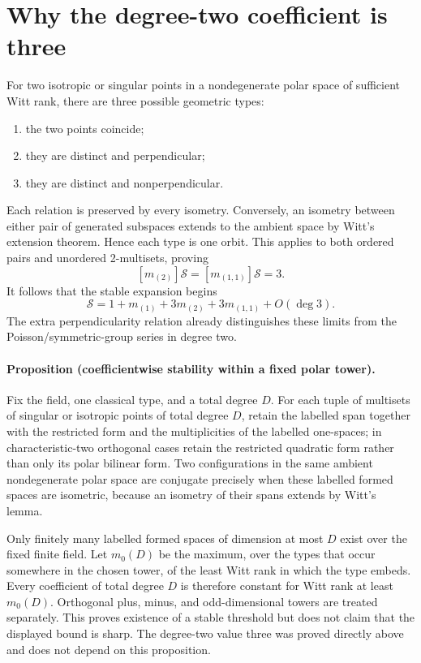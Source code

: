 \documentclass[10pt]{article}
\newcommand{\Sg}{\mathcal S}
\begin{document}
\section{Why the degree-two coefficient is three}
For two isotropic or singular points in a nondegenerate polar space of
sufficient Witt rank, there are three possible geometric types:
\begin{enumerate}
 \item the two points coincide;
 \item they are distinct and perpendicular;
 \item they are distinct and nonperpendicular.
\end{enumerate}
Each relation is preserved by every isometry.  Conversely, an isometry
between either pair of generated subspaces extends to the ambient space by
Witt's extension theorem.  Hence each type is one orbit.  This applies to
both ordered pairs and unordered 2-multisets, proving
\begin{equation}
 \boxed{[m_{(2)}]\Sg=[m_{(1,1)}]\Sg=3.}
\end{equation}
It follows that the stable expansion begins
\[
 \Sg=1+m_{(1)}+3m_{(2)}+3m_{(1,1)}+O(\deg3).
\]
The extra perpendicularity relation already distinguishes these limits from
the Poisson/symmetric-group series in degree two.

\paragraph{Proposition (coefficientwise stability within a fixed polar tower).}
Fix the field, one classical type, and a total degree $D$.  For each tuple of
multisets of singular or isotropic points of total degree $D$, retain the
labelled span together with the restricted form and the multiplicities of the
labelled one-spaces; in characteristic-two orthogonal cases retain the
restricted quadratic form rather than only its polar bilinear form.  Two
configurations in the same ambient nondegenerate polar space are conjugate
precisely when these labelled formed spaces are isometric, because an
isometry of their spans extends by Witt's lemma.

Only finitely many labelled formed spaces of dimension at most $D$ exist over
the fixed finite field.  Let $m_0(D)$ be the maximum, over the types that occur
somewhere in the chosen tower, of the least Witt rank in which the type
embeds.  Every coefficient of total degree $D$ is therefore constant for Witt
rank at least $m_0(D)$.  Orthogonal plus, minus, and odd-dimensional towers
are treated separately.  This proves existence of a stable threshold but
does not claim that the displayed bound is sharp.  The degree-two value three
was proved directly above and does not depend on this proposition.
\end{document}
